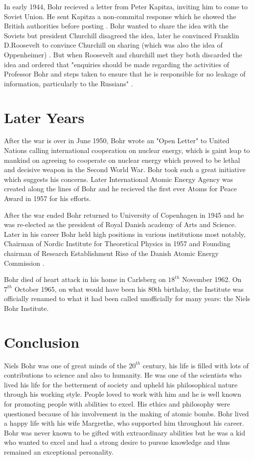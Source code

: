 \documentclass[11pt, article]{scrartcl}
\begin{document}
    In early 1944, Bohr recieved a letter from Peter Kapitza, inviting him to come to Soviet Union. He sent Kapitza a non-commital response
    which he showed the British authorities before posting \cite{archives}. Bohr wanted to share the idea with the Soviets but president Churchill disagreed
    the idea, later he convinced Franklin D.Roosevelt to convince Churchill on sharing (which was also the idea of Oppenheimer) \cite{war}. But when
    Roosevelt and churchill met they both discarded the idea and ordered that "enquiries should be made regarding the activities of Professor
    Bohr and steps taken to ensure that he is responsible for no leakage of information, particularly to the Russians" \cite{bomb}.

\section{Later Years}
	After the war is over in June 1950, Bohr wrote an "Open Letter" to United Nations calling international cooperation on nuclear energy\cite{letter}, 
	which is gaint leap to mankind on agreeing to cooperate on nuclear energy which proved to be lethal and decisive weapon in the Second World War. Bohr took such
	a great initiative which suggests his concerns. Later International Atomic Energy Agency was created along the lines 
	of Bohr and he recieved the first ever Atoms for Peace Award in 1957 for his efforts. 

	After the war ended Bohr returned to University of Copenhagen in 1945 and he was re-elected as the president of Royal Danish academy of Arts and Science. 
	Later in his career Bohr held high positions in various institutions most notably,  Chairman of Nordic Institute for Theoretical
	Physics in 1957 and Founding chairman of Research Establishment Risø of the Danish Atomic Energy Commission \cite{final}.

	Bohr died of heart attack in his home in Carlsberg on $18^{th}$ November 1962. On $7^{th}$ October 1965, on what would have been his 80th birthday, the
	Institute was officially renamed to what it had been called unofficially for many years: the Niels Bohr Institute\cite{archives}.

\section{Conclusion}
	Niels Bohr was one of great minds of the $20^{th}$  century, his life is filled with lots of contributions to science and also to humanity.
	He was one of the scientists who lived his life for the betterment of society and upheld his philosophical nature through his working style. 
	People loved to work with him and he is well known for promoting people with abilities to excel. His ethics and philosophy were questioned
	because of his involvement in the making of atomic bombs. Bohr lived a happy life with his wife Margrethe, who 
	supported him throughout his career. Bohr was never known to be gifted with extraordinary abilities but he was a kid who wanted to excel and
	had a strong desire to pursue knowledge and thus remained an exceptional personality.



\end{document}
